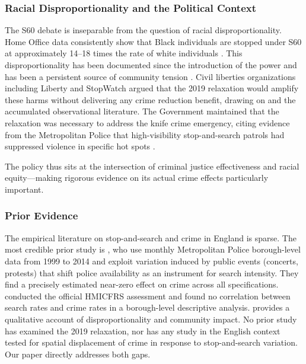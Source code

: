 \documentclass[12pt]{article}
\begin{document}
\subsubsection*{Racial Disproportionality and the Political Context}

The S60 debate is inseparable from the question of racial disproportionality. Home Office data consistently show that Black individuals are stopped under S60 at approximately 14--18 times the rate of white individuals \citep{homeoffice2020dispro}. This disproportionality has been documented since the introduction of the power and has been a persistent source of community tension \citep{shiner2015, bradford2017}. Civil liberties organizations including Liberty and StopWatch argued that the 2019 relaxation would amplify these harms without delivering any crime reduction benefit, drawing on \citet{tiratelli2018} and the accumulated observational literature. The Government maintained that the relaxation was necessary to address the knife crime emergency, citing evidence from the Metropolitan Police that high-visibility stop-and-search patrols had suppressed violence in specific hot spots \citep{hmicfrs2017}.

The policy thus sits at the intersection of criminal justice effectiveness and racial equity---making rigorous evidence on its actual crime effects particularly important.

\subsubsection*{Prior Evidence}

The empirical literature on stop-and-search and crime in England is sparse. The most credible prior study is \citet{tiratelli2018}, who use monthly Metropolitan Police borough-level data from 1999 to 2014 and exploit variation induced by public events (concerts, protests) that shift police availability as an instrument for search intensity. They find a precisely estimated near-zero effect on crime across all specifications. \citet{mccandless2016} conducted the official HMICFRS assessment and found no correlation between search rates and crime rates in a borough-level descriptive analysis. \citet{shiner2015} provides a qualitative account of disproportionality and community impact. No prior study has examined the 2019 relaxation, nor has any study in the English context tested for spatial displacement of crime in response to stop-and-search variation. Our paper directly addresses both gaps.
\end{document}
